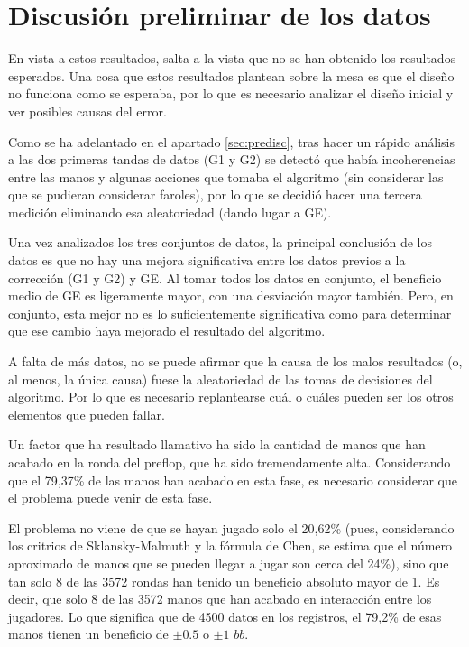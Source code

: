 \section{Discusión preliminar de los datos}

En vista a estos resultados, salta a la vista que no se han obtenido los resultados esperados. Una cosa que estos resultados plantean sobre la mesa es que el diseño no funciona como se esperaba, por lo que es necesario analizar el diseño inicial y ver posibles causas del error.

Como se ha adelantado en el apartado \ref{sec:predisc}, tras hacer un rápido análisis a las dos primeras tandas de datos (G1 y G2) se detectó que había incoherencias entre las manos y algunas acciones que tomaba el algoritmo (sin considerar las que se pudieran considerar faroles), por lo que se decidió hacer una tercera medición eliminando esa aleatoriedad (dando lugar a GE). 

Una vez analizados los tres conjuntos de datos, la principal conclusión de los datos es que no hay una mejora significativa entre los datos previos a la corrección (G1 y G2)  y GE. Al tomar todos los datos en conjunto, el beneficio medio de GE es ligeramente mayor, con una desviación mayor también. Pero, en conjunto, esta mejor no es lo suficientemente significativa como para determinar que ese cambio haya mejorado el resultado del algoritmo.

A falta de más datos, no se puede afirmar que la causa de los malos resultados (o, al menos, la única causa) fuese la aleatoriedad de las tomas de decisiones del algoritmo. Por lo que es necesario replantearse cuál o cuáles pueden ser los otros elementos que pueden fallar.

Un factor que ha resultado llamativo ha sido la cantidad de manos que han acabado en la ronda del preflop, que ha sido tremendamente alta. Considerando que el 79,37\% de las manos han acabado en esta fase, es necesario considerar que el problema puede venir de esta fase.

 El problema no viene de que se hayan jugado solo el 20,62\% (pues, considerando los critrios de Sklansky-Malmuth y la fórmula de Chen, se estima que el número aproximado de manos que se pueden llegar a jugar son cerca del 24\%), sino que tan solo 8 de las 3572 rondas han tenido un beneficio absoluto mayor de 1. Es decir, que solo 8 de las 3572 manos que han acabado en interacción entre los jugadores. Lo que significa que de 4500 datos en los registros, el 79,2\% de esas manos tienen un beneficio de $\pm0.5$ o $\pm1$ $bb$.

